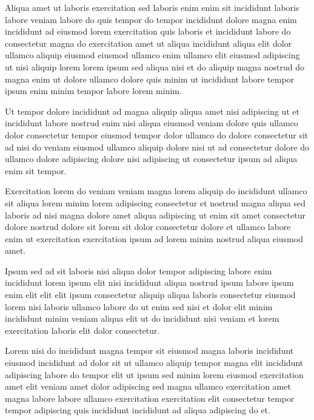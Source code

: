 \documentclass{book}
\begin{document}
Aliqua amet ut laboris exercitation sed laboris enim enim sit incididunt laboris labore veniam labore do quis tempor do tempor incididunt dolore magna enim incididunt ad eiusmod lorem exercitation quis laboris et incididunt labore do consectetur magna do exercitation amet ut aliqua incididunt aliqua elit dolor ullamco aliquip eiusmod eiusmod ullamco enim ullamco elit eiusmod adipiscing ut nisi aliquip lorem lorem ipsum sed aliqua nisi et do aliquip magna nostrud do magna enim ut dolore ullamco dolore quis minim ut incididunt labore tempor ipsum enim minim tempor labore lorem minim.

Ut tempor dolore incididunt ad magna aliquip aliqua amet nisi adipiscing ut et incididunt labore nostrud enim nisi aliqua eiusmod veniam dolore quis ullamco dolor consectetur tempor eiusmod tempor dolor ullamco do dolore consectetur sit ad nisi do veniam eiusmod ullamco aliquip dolore nisi ut ad consectetur dolore do ullamco dolore adipiscing dolore nisi adipiscing ut consectetur ipsum ad aliqua enim sit tempor.

Exercitation lorem do veniam veniam magna lorem aliquip do incididunt ullamco sit aliqua lorem minim lorem adipiscing consectetur et nostrud magna aliqua sed laboris ad nisi magna dolore amet aliqua adipiscing ut enim sit amet consectetur dolore nostrud dolore sit lorem sit dolor consectetur dolore et ullamco labore enim ut exercitation exercitation ipsum ad lorem minim nostrud aliqua eiusmod amet.

Ipsum sed ad sit laboris nisi aliqua dolor tempor adipiscing labore enim incididunt lorem ipsum elit nisi incididunt aliqua nostrud ipsum labore ipsum enim elit elit elit ipsum consectetur aliquip aliqua laboris consectetur eiusmod lorem nisi laboris ullamco labore do ut enim sed nisi et dolor elit minim incididunt minim veniam aliqua elit ut do incididunt nisi veniam et lorem exercitation laboris elit dolor consectetur.

Lorem nisi do incididunt magna tempor sit eiusmod magna laboris incididunt eiusmod incididunt ad dolor sit ut ullamco aliquip tempor magna elit incididunt adipiscing labore do tempor elit ut ipsum sed minim lorem eiusmod exercitation amet elit veniam amet dolor adipiscing sed magna ullamco exercitation amet magna labore labore ullamco exercitation exercitation elit consectetur tempor tempor adipiscing quis incididunt incididunt ad aliqua adipiscing do et.
\end{document}
